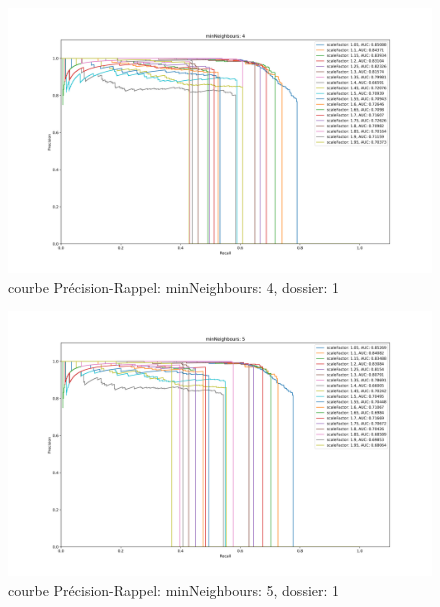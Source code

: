 \documentclass[a4paper,11pt]{article}
\begin{document}
	\begin{figure}[H]
	    \begin{center}
		\includegraphics[scale = 0.4]{images/courbes/folder_01_minN_4.png}
		\caption{courbe Précision-Rappel: minNeighbours: 4, dossier: 1}
		\label{fig:minN_2}
	    \end{center}
	\end{figure}

	\begin{figure}[H]
	    \begin{center}
		\includegraphics[scale = 0.4]{images/courbes/folder_01_minN_5.png}
		\caption{courbe Précision-Rappel: minNeighbours: 5, dossier: 1}
		\label{fig:minN_2}
	    \end{center}
	\end{figure}
\end{document}
